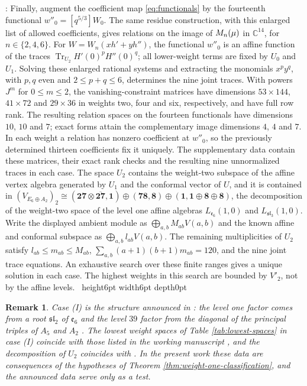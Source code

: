 \documentclass[leqno]{article}
\newcommand{\Cbb}{\ensuremath{\mathbb{C}}}
\let\cal\relax
\newcommand{\cal}{\mathcal}
\renewcommand{\leq}{\ensuremath{\leqslant}}
\newcommand{\qed}{\hfill \vrule height6pt  width6pt depth0pt}
\newcommand{\ot}{\otimes}
\newtheorem{remark}[thm]{Remark}
\newenvironment{proof}[1][]{\noindent {\it Proof #1} : }{\hbox{~}\qed
\smallskip
}
\numberwithin{equation}{section}
\begin{document}
\begin{proof}
Finally, augment the coefficient map \eqref{eq:functionals} by the fourteenth functional $w''_0 = [q^{5/3}]W_0$. The same residue construction, with this enlarged list of allowed coefficients, gives relations on the image of $\cal M_n(\mu)$ in $\Cbb^{14}$, for $n \in \{2,4,6\}$. For $W = W_n(xh'+yh'')$, the functional $w''_0$ is an affine function of the traces $\operatorname{Tr}_{U_2}H'(0)^pH''(0)^q$; all lower-weight terms are fixed by $U_0$ and $U_1$. Solving these enlarged rational systems and extracting the monomials $x^py^q$, with $p,q$ even and $2 \leq p+q \leq 6$, determines the nine joint traces. With powers $J^m$ for $0 \leq m \leq 2$, the vanishing-constraint matrices have dimensions $53 \times 144$, $41 \times 72$ and $29 \times 36$ in weights two, four and six, respectively, and have full row rank. The resulting relation spaces on the fourteen functionals have dimensions $10$, $10$ and $7$; exact forms attain the complementary image dimensions $4$, $4$ and $7$. In each weight a relation has nonzero coefficient at $w''_0$, so the previously determined thirteen coefficients fix it uniquely. The supplementary data contain these matrices, their exact rank checks and the resulting nine unnormalized traces in each case. The space $U_2$ contains the weight-two subspace of the affine vertex algebra generated by $U_1$ and the conformal vector of $U$, and it is contained in $(V_{E_6 \oplus A_2})_2 \cong (\mathbf{27} \ot \overline{\mathbf{27}},\mathbf 1) \oplus (\mathbf{78},\mathbf 8) \oplus (\mathbf 1,\mathbf 1 \oplus \mathbf 8 \oplus \mathbf 8)$, the decomposition of the weight-two space of the level one affine algebras $L_{\mathfrak e_6}(1,0)$ and $L_{\mathfrak{sl}_3}(1,0)$. Write the displayed ambient module as $\bigoplus_{a,b}M_{ab}V(a,b)$ and the known affine and conformal subspace as $\bigoplus_{a,b}l_{ab}V(a,b)$. The remaining multiplicities of $U_2$ satisfy $l_{ab} \leq m_{ab} \leq M_{ab}$, $\sum_{a,b}(a+1)(b+1)m_{ab} = 120$, and the nine joint trace equations. An exhaustive search over these finite ranges gives a unique solution in each case. The highest weights in this search are bounded by $V'_2$, not by the affine levels.
\end{proof}

\begin{remark}\normalfont
\label{rem:case-one-announced}
Case (I) is the structure announced in \cite{Rie26,Hua26}: the level one factor comes from a root $\mathfrak{sl}_2$ of $\mathfrak e_6$ and the level $39$ factor from the diagonal of the principal triples of $A_5$ and $A_2$ \cite[Section 1]{Rie26b}. The lowest weight spaces of Table \ref{tab:lowest-spaces} in case (I) coincide with those listed in the working manuscript \cite{Rie26b}, and the decomposition of $U_2$ coincides with \cite[Appendix H.1]{Rie26b}. In the present work these data are consequences of the hypotheses of Theorem \ref{thm:weight-one-classification}, and the announced data serve only as a test.
\end{remark}
\end{document}
